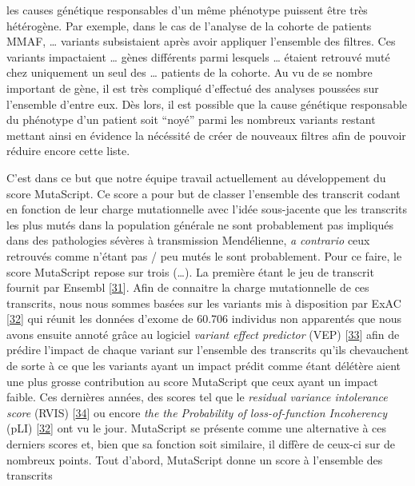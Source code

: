\documentclass[12pt,twoside]{reedthesis}
\begin{document}
  les causes génétique responsables d'un même phénotype puissent être très
  hétérogène. Par exemple, dans le cas de l'analyse de la cohorte de
  patients MMAF, \ldots{} variants subsistaient après avoir appliquer
  l'ensemble des filtres. Ces variants impactaient \ldots{} gènes
  différents parmi lesquels \ldots{} étaient retrouvé muté chez uniquement
  un seul des \ldots{} patients de la cohorte. Au vu de se nombre
  important de gène, il est très compliqué d'effectué des analyses
  poussées sur l'ensemble d'entre eux. Dès lors, il est possible que la
  cause génétique responsable du phénotype d'un patient soit ``noyé''
  parmi les nombreux variants restant mettant ainsi en évidence la
  nécéssité de créer de nouveaux filtres afin de pouvoir réduire encore
  cette liste.
  
  C'est dans ce but que notre équipe travail actuellement au développement
  du score MutaScript. Ce score a pour but de classer l'ensemble des
  transcrit codant en fonction de leur charge mutationnelle avec l'idée
  sous-jacente que les transcrits les plus mutés dans la population
  générale ne sont probablement pas impliqués dans des pathologies sévères
  à transmission Mendélienne, \emph{a contrario} ceux retrouvés comme
  n'étant pas / peu mutés le sont probablement. Pour ce faire, le score
  MutaScript repose sur trois (\ldots{}). La première étant le jeu de
  transcrit fournit par Ensembl
  {[}\protect\hyperlink{ref-Aken2017}{31}{]}. Afin de connaitre la charge
  mutationnelle de ces transcrits, nous nous sommes basées sur les
  variants mis à disposition par ExAC
  {[}\protect\hyperlink{ref-Lek2016}{32}{]} qui réunit les données d'exome
  de 60.706 individus non apparentés que nous avons ensuite annoté grâce
  au logiciel \emph{variant effect predictor} (VEP)
  {[}\protect\hyperlink{ref-McLaren2016}{33}{]} afin de prédire l'impact
  de chaque variant sur l'ensemble des transcrits qu'ils chevauchent de
  sorte à ce que les variants ayant un impact prédit comme étant délétère
  aient une plus grosse contribution au score MutaScript que ceux ayant un
  impact faible. Ces dernières années, des scores tel que le
  \emph{residual variance intolerance score} (RVIS)
  {[}\protect\hyperlink{ref-Petrovski2013}{34}{]} ou encore \emph{the the
  Probability of loss-of-function Incoherency} (pLI)
  {[}\protect\hyperlink{ref-Lek2016}{32}{]} ont vu le jour. MutaScript se
  présente comme une alternative à ces derniers scores et, bien que sa
  fonction soit similaire, il diffère de ceux-ci sur de nombreux points.
  Tout d'abord, MutaScript donne un score à l'ensemble des transcrits
\end{document}
